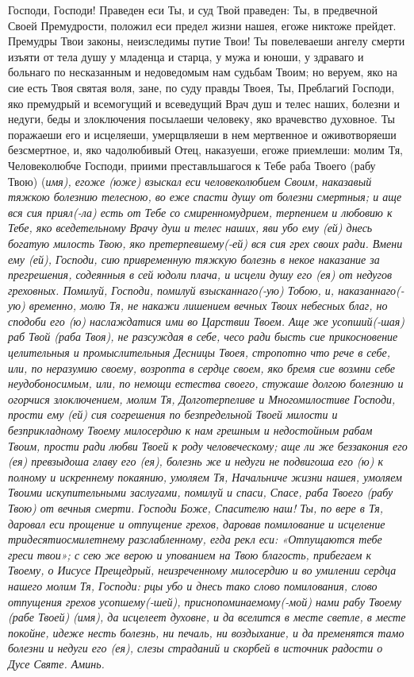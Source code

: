  


Господи, Господи! Праведен еси Ты, и суд Твой праведен: Ты, в предвечной Своей Премудрости, положил еси предел жизни нашея, егоже никтоже прейдет. Премудры Твои законы, неизследимы путие Твои! Ты повелеваеши ангелу смерти изъяти от тела душу у младенца и старца, у мужа и юноши, у здраваго и больнаго по несказанным и недоведомым нам судьбам Твоим; но веруем, яко на сие есть Твоя святая воля, зане, по суду правды Твоея, Ты, Преблагий Господи, яко премудрый и всемогущий и всеведущий Врач душ и телес наших, болезни и недуги, беды и злоключения посылаеши человеку, яко врачевство духовное. Ты поражаеши его и исцеляеши, умерщвляеши в нем мертвенное и оживотворяеши безсмертное, и, яко чадолюбивый Отец, наказуеши, егоже приемлеши: молим Тя, Человеколюбче Господи, приими преставльшагося к Тебе раба Твоего (рабу Твою) (\itshape имя\normalfont{}), егоже (юже) взыскал еси человеколюбием Своим, наказавый тяжкою болезнию телесною, во еже спасти душу от болезни смертныя; и аще вся сия приял(-ла) есть от Тебе со смиренномудрием, терпением и любовию к Тебе, яко вседетельному Врачу душ и телес наших, яви убо ему (ей) днесь богатую милость Твою, яко претерпевшему(-ей) вся сия грех своих ради. Вмени ему (ей), Господи, сию привременную тяжкую болезнь в некое наказание за прегрешения, содеянныя в сей юдоли плача, и исцели душу его (ея) от недугов греховных. Помилуй, Господи, помилуй взысканнаго(-ую) Тобою, и, наказаннаго(-ую) временно, молю Тя, не накажи лишением вечных Твоих небесных благ, но сподоби его (ю) наслаждатися ими во Царствии Твоем. Аще же усопший(-шая) раб Твой (раба Твоя), не разсуждая в себе, чесо ради бысть сие прикосновение целительныя и промыслительныя Десницы Твоея, стропотно что рече в себе, или, по неразумию своему, возропта в сердце своем, яко бремя сие возмни себе неудобоносимым, или, по немощи естества своего, стужаше долгою болезнию и огорчися злоключением, молим Тя, Долготерпеливе и Многомилостиве Господи, прости ему (ей) сия согрешения по безпредельной Твоей милости и безприкладному Твоему милосердию к нам грешным и недостойным рабам Твоим, прости ради любви Твоей к роду человеческому; аще ли же беззакония его (ея) превзыдоша главу его (ея), болезнь же и недуги не подвигоша его (ю) к полному и искреннему покаянию, умоляем Тя, Начальниче жизни нашея, умоляем Твоими искупительными заслугами, помилуй и спаси, Спасе, раба Твоего (рабу Твою) от вечныя смерти. Господи Боже, Спасителю наш! Ты, по вере в Тя, даровал еси прощение и отпущение грехов, даровав помилование и исцеление тридесятиосмилетнему разслабленному, егда рекл еси: «Отпущаются тебе греси твои»; с сею же верою и упованием на Твою благость, прибегаем к Твоему, о Иисусе Прещедрый, неизреченному милосердию и во умилении сердца нашего молим Тя, Господи: рцы убо и днесь тако слово помилования, слово отпущения грехов усопшему(-шей), приснопоминаемому(-мой) нами рабу Твоему (рабе Твоей) (\itshape имя\normalfont{}), да исцелеет духовне, и да вселится в месте светле, в месте покойне, идеже несть болезнь, ни печаль, ни воздыхание, и да пременятся тамо болезни и недуги его (ея), слезы страданий и скорбей в источник радости о Дусе Святе. Аминь. 
